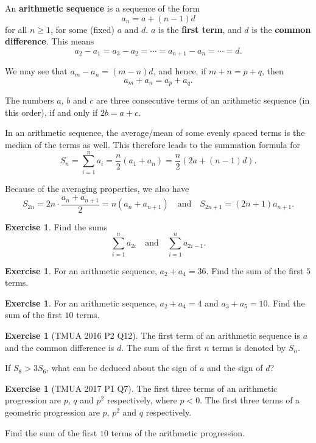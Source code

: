 \documentclass[11pt]{article}
\theoremstyle{definition}
\newtheorem{example}[theorem]{Exercise}
\theoremstyle{remark}
\newcommand{\pqty}[1]{\left(#1\right)}
\newcommand{\qand}{\quad\text{and}\quad}
\begin{document}
An \textbf{arithmetic sequence} is a sequence of the form
\[
    a_n = a + \pqty{n - 1} d
\]
for all \(n \geq 1\), for some (fixed) \(a\) and \(d\). \(a\) is the \textbf{first term}, and \(d\) is the \textbf{common difference}. This means
\[
    a_2 - a_1 = a_3 - a_2 = \cdots = a_{n + 1} - a_n = \cdots = d.
\]

We may see that \(a_m - a_n = \pqty{m - n} d\), and hence, if \(m + n = p + q\), then
\[
    a_m + a_n = a_p + a_q.
\]

The numbers \(a\), \(b\) and \(c\) are three consecutive terms of an arithmetic sequence (in this order), if and only if \(2b = a + c\).

In an arithmetic sequence, the average/mean of some evenly spaced terms is the median of the terms as well. This therefore leads to the summation formula for
\[
    S_n = \sum_{i = 1}^{n} a_i = \frac{n}{2} \pqty{a_1 + a_n} = \frac{n}{2} \pqty{2 a + \pqty{n - 1}d}.
\]

Because of the averaging properties, we also have
\[
    S_{2n} = 2n \cdot \frac{a_n + a_{n + 1}}{2} = n \pqty{a_n + a_{n + 1}} \qand S_{2n + 1} = \pqty{2n + 1} a_{n + 1}.
\]

\begin{example}\label{tmua-4-unit-007}
    Find the sums
    \[
        \sum_{i = 1}^{n} a_{2i} \qand \sum_{i = 1}^{n} a_{2i - 1}.
    \]
\end{example}

\begin{example}\label{tmua-4-unit-008}
    For an arithmetic sequence, \(a_2 + a_4 = 36\). Find the sum of the first \(5\) terms.
\end{example}

\begin{example}\label{tmua-4-unit-009}
    For an arithmetic sequence, \(a_2 + a_4 = 4\) and \(a_3 + a_5 = 10\). Find the sum of the first \(10\) terms.
\end{example}

\begin{example}[TMUA 2016 P2 Q12]\label{tmua-4-unit-010}
    The first term of an arithmetic sequence is \(a\) and the common difference is \(d\). The sum of the first \(n\) terms is denoted by \(S_n\).

    If \(S_8 > 3 S_6\), what can be deduced about the sign of \(a\) and the sign of \(d\)?
\end{example}

\begin{example}[TMUA 2017 P1 Q7]\label{tmua-4-unit-011}
    The first three terms of an arithmetic progression are \(p\), \(q\) and \(p^2\) respectively, where \(p < 0\). The first three terms of a geometric progression are \(p\), \(p^2\) and \(q\) respectively.

    Find the sum of the first \(10\) terms of the arithmetic progression.
\end{example}
\end{document}

